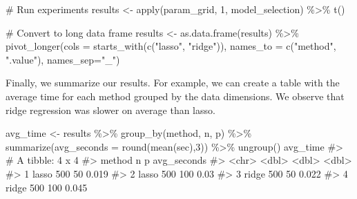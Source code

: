 \documentclass[
  letterpaper,
]{latex/krantz}
\makeatletter
\newenvironment{Shaded}{\begin{snugshade}}{\end{snugshade}}
\newcommand{\AttributeTok}[1]{\textcolor[rgb]{0.40,0.45,0.13}{#1}}
\newcommand{\CommentTok}[1]{\textcolor[rgb]{0.37,0.37,0.37}{#1}}
\newcommand{\DecValTok}[1]{\textcolor[rgb]{0.68,0.00,0.00}{#1}}
\newcommand{\FunctionTok}[1]{\textcolor[rgb]{0.28,0.35,0.67}{#1}}
\newcommand{\NormalTok}[1]{\textcolor[rgb]{0.00,0.23,0.31}{#1}}
\newcommand{\OtherTok}[1]{\textcolor[rgb]{0.00,0.23,0.31}{#1}}
\newcommand{\SpecialCharTok}[1]{\textcolor[rgb]{0.37,0.37,0.37}{#1}}
\newcommand{\StringTok}[1]{\textcolor[rgb]{0.13,0.47,0.30}{#1}}
\newenvironment{kframe}{%
\medskip{}
\setlength{\fboxsep}{.8em}
 \def\at@end@of@kframe{}%
 \ifinner\ifhmode%
  \def\at@end@of@kframe{\end{minipage}}%
  \begin{minipage}{\columnwidth}%
 \fi\fi%
 \def\FrameCommand##1{\hskip\@totalleftmargin \hskip-\fboxsep
 \colorbox{shadecolor}{##1}\hskip-\fboxsep
     \hskip-\linewidth \hskip-\@totalleftmargin \hskip\columnwidth}%
 \MakeFramed {\advance\hsize-\width
   \@totalleftmargin\z@ \linewidth\hsize
   \@setminipage}}%
 {\par\unskip\endMakeFramed%
 \at@end@of@kframe}
\renewenvironment{Shaded}{\begin{kframe}}{\end{kframe}}
\makeatother
\begin{document}
\begin{Shaded}
\begin{Highlighting}[]
\CommentTok{\# Run experiments}
\NormalTok{results }\OtherTok{\textless{}{-}} \FunctionTok{apply}\NormalTok{(param\_grid, }\DecValTok{1}\NormalTok{, model\_selection) }\SpecialCharTok{\%\textgreater{}\%} \FunctionTok{t}\NormalTok{() }

\CommentTok{\# Convert to long data frame}
\NormalTok{results }\OtherTok{\textless{}{-}} \FunctionTok{as.data.frame}\NormalTok{(results) }\SpecialCharTok{\%\textgreater{}\%} 
  \FunctionTok{pivot\_longer}\NormalTok{(}\AttributeTok{cols =} \FunctionTok{starts\_with}\NormalTok{(}\FunctionTok{c}\NormalTok{(}\StringTok{"lasso"}\NormalTok{, }\StringTok{"ridge"}\NormalTok{)),}
               \AttributeTok{names\_to =} \FunctionTok{c}\NormalTok{(}\StringTok{"method"}\NormalTok{, }\StringTok{".value"}\NormalTok{), }\AttributeTok{names\_sep=}\StringTok{"\_"}\NormalTok{)}
\end{Highlighting}
\end{Shaded}

Finally, we summarize our results. For example, we can create a table
with the average time for each method grouped by the data dimensions. We
observe that ridge regression was slower on average than lasso.

\begin{Shaded}
\begin{Highlighting}[]
\NormalTok{avg\_time }\OtherTok{\textless{}{-}}\NormalTok{ results }\SpecialCharTok{\%\textgreater{}\%}
  \FunctionTok{group\_by}\NormalTok{(method, n, p) }\SpecialCharTok{\%\textgreater{}\%}
  \FunctionTok{summarize}\NormalTok{(}\AttributeTok{avg\_seconds =} \FunctionTok{round}\NormalTok{(}\FunctionTok{mean}\NormalTok{(sec),}\DecValTok{3}\NormalTok{)) }\SpecialCharTok{\%\textgreater{}\%}
  \FunctionTok{ungroup}\NormalTok{()}
\NormalTok{avg\_time}
\CommentTok{\#\textgreater{} \# A tibble: 4 x 4}
\CommentTok{\#\textgreater{}   method     n     p avg\_seconds}
\CommentTok{\#\textgreater{}   \textless{}chr\textgreater{}  \textless{}dbl\textgreater{} \textless{}dbl\textgreater{}       \textless{}dbl\textgreater{}}
\CommentTok{\#\textgreater{} 1 lasso    500    50       0.019}
\CommentTok{\#\textgreater{} 2 lasso    500   100       0.03 }
\CommentTok{\#\textgreater{} 3 ridge    500    50       0.022}
\CommentTok{\#\textgreater{} 4 ridge    500   100       0.045}
\end{Highlighting}
\end{Shaded}
\end{document}
